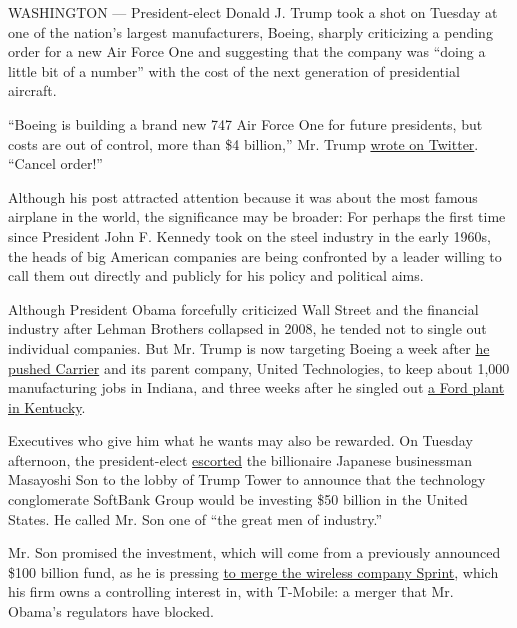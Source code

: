 WASHINGTON --- President-elect Donald J. Trump took a shot on Tuesday at
one of the nation's largest manufacturers, Boeing, sharply criticizing a
pending order for a new Air Force One and suggesting that the company
was ``doing a little bit of a number'' with the cost of the next
generation of presidential aircraft.

``Boeing is building a brand new 747 Air Force One for future
presidents, but costs are out of control, more than \$4 billion,'' Mr.
Trump
\href{https://twitter.com/realDonaldTrump/status/806134244384899072}{wrote
on Twitter}. ``Cancel order!''

Although his post attracted attention because it was about the most
famous airplane in the world, the significance may be broader: For
perhaps the first time since President John F. Kennedy took on the steel
industry in the early 1960s, the heads of big American companies are
being confronted by a leader willing to call them out directly and
publicly for his policy and political aims.

Although President Obama forcefully criticized Wall Street and the
financial industry after Lehman Brothers collapsed in 2008, he tended
not to single out individual companies. But Mr. Trump is now targeting
Boeing a week after
\href{http://www.nytimes.com/2016/11/29/business/trump-to-announce-carrier-plant-will-keep-jobs-in-us.html}{he
pushed Carrier} and its parent company, United Technologies, to keep
about 1,000 manufacturing jobs in Indiana, and three weeks after he
singled out
\href{http://www.nytimes.com/2016/11/18/us/politics/donald-trump-takes-credit-for-helping-to-save-a-ford-plant-that-wasnt-closing.html}{a
Ford plant in Kentucky}.

Executives who give him what he wants may also be rewarded. On Tuesday
afternoon, the president-elect
\href{http://www.nytimes.com/2016/12/04/business/dealbook/masayoshi-son-softbank-mobile.html}{escorted}
the billionaire Japanese businessman Masayoshi Son to the lobby of Trump
Tower to announce that the technology conglomerate SoftBank Group would
be investing \$50 billion in the United States. He called Mr. Son one of
``the great men of industry.''

Mr. Son promised the investment, which will come from a previously
announced \$100 billion fund, as he is pressing
\href{http://dealbook.nytimes.com/2014/08/05/sprint-and-softbank-said-to-abandon-bid-for-t-mobile-us/}{to
merge the wireless company Sprint}, which his firm owns a controlling
interest in, with T-Mobile: a merger that Mr. Obama's regulators have
blocked.

